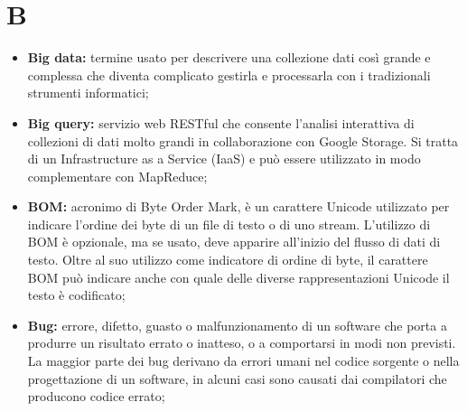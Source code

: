 \section*{B} %
\label{sec:b}
	\begin{itemize}
		\item \textbf{Big data:} termine usato per descrivere una collezione dati così grande e complessa che diventa complicato gestirla e processarla con i tradizionali strumenti informatici;
		\item \textbf{Big query:} servizio web RESTful che consente l'analisi interattiva di collezioni di dati molto grandi in collaborazione con Google Storage. Si tratta di un Infrastructure as a Service (IaaS) e può essere utilizzato in modo complementare con MapReduce;
		\item \textbf{BOM:} acronimo di Byte Order Mark, è un carattere Unicode utilizzato per indicare l'ordine dei byte di un file di testo o di uno stream. L'utilizzo di BOM è opzionale, ma se usato, deve apparire all'inizio del flusso di dati di testo. Oltre al suo utilizzo come indicatore di ordine di byte, il carattere BOM può indicare anche con quale delle diverse rappresentazioni Unicode il testo è codificato;
		\item \textbf{Bug:} errore, difetto, guasto o malfunzionamento di un software che porta a produrre un risultato errato o inatteso, o a comportarsi in modi non previsti. La maggior parte dei bug derivano da errori umani nel codice sorgente o nella progettazione di un software, in alcuni casi sono causati dai compilatori che producono codice errato;
	\end{itemize}
\pagebreak

